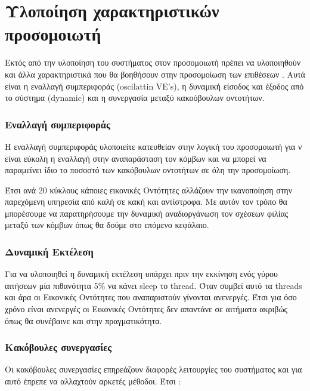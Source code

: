 \section{Υλοποίηση χαρακτηριστικών προσομοιωτή}
Εκτός από την υλοποίηση του συστήματος στον προσομοιωτή πρέπει να υλοποιηθούν και άλλα χαρακτηριστικά που θα βοηθήσουν στην προσομοίωση των επιθέσεων . Αυτά είναι η εναλλαγή συμπεριφοράς (oscilattin VE's), η δυναμική είσοδος και έξοδος από το σύστημα (dynamic) και η συνεργασία μεταξύ κακοόβουλων οντοτήτων.

\subsubsection{Εναλλαγή συμπεριφοράς} 
Η εναλλαγή συμπεριφοράς υλοποιείτε κατευθείαν στην λογική του προσομοιωτή για ν είναι εύκολη η εναλλαγή στην αναπαράσταση τον κόμβων και να μπορεί να παραμείνει ίδιο το ποσοστό των κακόβουλων οντοτήτων σε όλη την προσομοίωση.

 Έτσι ανά 20 κύκλους κάποιες εικονικές Οντότητες αλλάζουν την ικανοποίηση στην παρεχόμενη υπηρεσία από καλή σε κακή και αντίστροφα. Με αυτόν τον τρόπο θα μπορέσουμε να παρατηρήσουμε την δυναμική αναδιοργάνωση τον σχέσεων φιλίας μεταξύ των κόμβων όπως θα δούμε στο επόμενο κεφάλαιο.
 
   
 \newpage  
 \subsubsection{Δυναμική Εκτέλεση}
 
 Για να υλοποιηθεί η δυναμική εκτέλεση υπάρχει πριν την εκκίνηση ενός γύρου αιτήσεων μία πιθανότητα 5\% να κάνει sleep το thread. Όταν συμβεί αυτό τα threads και άρα οι Εικονικές Οντότητες που αναπαριστούν γίνονται ανενεργές. Έτσι για όσο χρόνο είναι ανενεργές οι Εικονικές Οντότητες δεν απαντάνε σε αιτήματα ακριβώς όπως θα συνέβαινε και στην πραγματικότητα. 
 


 \subsubsection{Κακόβουλες συνεργασίες}
 
 Οι κακόβουλες συνεργασίες επηρεάζουν διαφορές λειτουργίες του συστήματος και για αυτό έπρεπε να αλλαχτούν αρκετές μέθοδοι. Έτσι :
 
